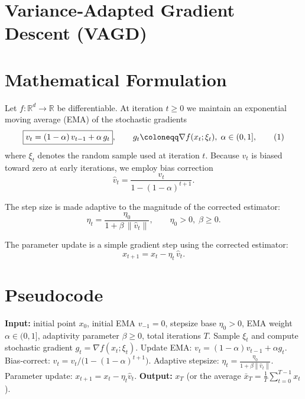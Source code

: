 \documentclass{article}
\newcommand{\norm}[1]{\left\|#1\right\|}
\begin{document}
\section*{Variance‑Adapted Gradient Descent (VAGD)}

\section*{Mathematical Formulation}
Let $f:\mathbb{R}^{d}\rightarrow\mathbb{R}$ be differentiable.  
At iteration $t\ge 0$ we maintain an exponential moving average (EMA) of the stochastic gradients
\[
\boxed{%
v_{t}= (1-\alpha)\,v_{t-1}+ \alpha\, g_{t}},\qquad 
g_{t}\coloneqq \nabla f(x_{t};\xi_{t}), \; \alpha\in(0,1],
\tag{1}
\]
where $\xi_{t}$ denotes the random sample used at iteration $t$.  
Because $v_{t}$ is biased toward zero at early iterations, we employ bias correction
\[
\boxed{\hat v_{t}= \frac{v_{t}}{1-(1-\alpha)^{t+1}}}.
\tag{2}
\]

The step size is made adaptive to the magnitude of the corrected estimator:
\[
\boxed{\eta_{t}= \frac{\eta_{0}}{1+\beta \,\norm{\hat v_{t}}}},\qquad 
\eta_{0}>0,\;\beta\ge 0.
\tag{3}
\]

The parameter update is a simple gradient step using the corrected estimator:
\[
\boxed{x_{t+1}= x_{t}-\eta_{t}\,\hat v_{t}}.
\tag{4}
\]

\section*{Pseudocode}
\begin{algorithm}[H]
\caption{Variance‑Adapted Gradient Descent (VAGD)}
\begin{algorithmic}[1]
\STATE \textbf{Input:} initial point $x_{0}$, initial EMA $v_{-1}=0$, 
stepsize base $\eta_{0}>0$, EMA weight $\alpha\in(0,1]$, 
adaptivity parameter $\beta\ge0$, total iterations $T$.
    \STATE Sample $\xi_{t}$ and compute stochastic gradient $g_{t}= \nabla f(x_{t};\xi_{t})$.
    \STATE Update EMA: $v_{t}= (1-\alpha)v_{t-1}+ \alpha g_{t}$.
    \STATE Bias‑correct: $\hat v_{t}= v_{t}/\bigl(1-(1-\alpha)^{t+1}\bigr)$.
    \STATE Adaptive stepsize: $\displaystyle \eta_{t}= \frac{\eta_{0}}{1+\beta \norm{\hat v_{t}}}$.
    \STATE Parameter update: $x_{t+1}= x_{t}-\eta_{t}\hat v_{t}$.
\ENDFOR
\STATE \textbf{Output:} $x_{T}$ (or the average $\bar x_{T}= \frac1T\sum_{t=0}^{T-1}x_{t}$).
\end{algorithmic}
\end{algorithm}
\end{document}
